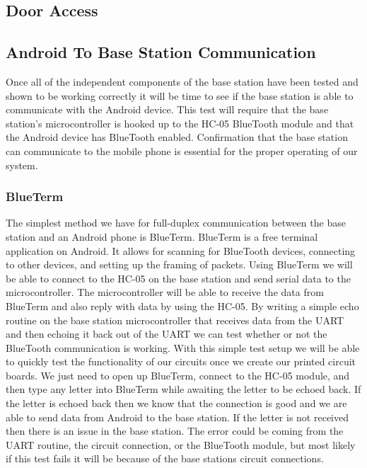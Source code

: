 \subsection{Door Access}
\tbw

\subsection{Android To Base Station Communication}
Once all of the independent components of the base station have been tested and
shown to be working correctly it will be time to see if the base station is
able to communicate with the Android device. This test will require that the
base station{}'s microcontroller is hooked up to the HC{}-05 BlueTooth module
and that the Android device has BlueTooth enabled. Confirmation that the base
station can communicate to the mobile phone is essential for the proper
operating of our system.

\subsubsection{BlueTerm}
The simplest method we have for full{}-duplex communication between the base
station and an Android phone is BlueTerm.  BlueTerm is a free terminal
application on Android. It allows for scanning for BlueTooth devices,
connecting to other devices, and setting up the framing of packets. Using
BlueTerm we will be able to connect to the HC{}-05 on the base station and send
serial data to the microcontroller. The microcontroller will be able to receive
the data from BlueTerm and also reply with data by using the HC{}-05. By
writing a simple echo routine on the base station microcontroller that receives
data from the UART and then echoing it back out of the UART we can test whether
or not the BlueTooth communication is working. With this simple test setup we
will be able to quickly test the functionality of our circuits once we create
our printed circuit boards. We just need to open up BlueTerm, connect to the
HC{}-05 module, and then type any letter into BlueTerm while awaiting the
letter to be echoed back. If the letter is echoed back then we know that the
connection is good and we are able to send data from Android to the base
station. If the letter is not received then there is an issue in the base
station. The error could be coming from the UART routine, the circuit
connection, or the BlueTooth module, but most likely if this test fails it will
be because of the base stations circuit connections.

